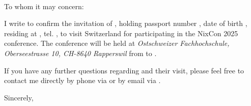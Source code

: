 \documentclass[
DIN5008B, %
USenglish,
fromphone=true,fromemail=true,fromlogo=true,
enlargefirstpage,
firstfoot=false
]{scrlttr2}
\newcommand{\addressee}{\toname\\\toaddress}
\begin{document}
\sloppy
\begin{letter}{\vspace{0.6cm}\addressee} %
  \opening{To whom it may concern:}
  I write to confirm the invitation of \emph{{\toname}}, holding passport number \emph{\passportnumber}, date of birth \emph{\dateofbirth}, residing at \emph{\StrSubstitute{\toaddress}{\\}{, }}, tel. \emph{\totel}, to visit Switzerland for participating in the NixCon 2025 conference.  The conference will be held at \emph{Ostschweizer Fachhochschule, Oberseestrasse 10, CH-8640 Rapperswil} from \emph{\arrivedate} to \emph{\departdate}.


  If you have any further questions regarding {\toname} and their visit, please feel free to contact me directly by phone via  or by email via .
  \closing{Sincerely,}
\end{letter}
\end{document}
